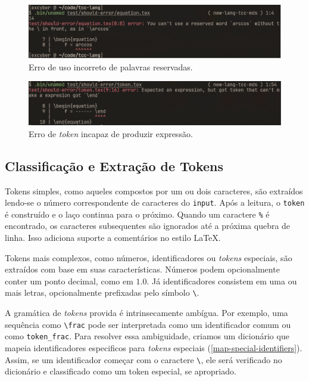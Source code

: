 \begin{figure}[H]
    \caption{\label{error-reserved-word} \small Erro de uso incorreto de palavras reservadas.}
    \begin{center}
        \includegraphics[scale=0.5]{./Imagens/error-reserved-word.png}
    \end{center}
\end{figure}


\begin{figure}[H]
    \caption{\label{error-cant-make-expression} \small Erro de \textit{token} incapaz de produzir expressão.}
    \begin{center}
        \includegraphics[scale=0.5]{./Imagens/error-cant-make-expression.png}
    \end{center}
\end{figure}


\subsection{Classificação e Extração de Tokens}


Tokens simples, como aqueles compostos por um ou dois caracteres, são extraídos lendo-se o número correspondente de caracteres do \texttt{input}. Após a leitura, o \texttt{token} é construído e o laço continua para o próximo. Quando um caractere \texttt{\%} é encontrado, os caracteres subsequentes são ignorados até a próxima quebra de linha. Isso adiciona suporte a comentários no estilo \LaTeX{}.

Tokens mais complexos, como números, identificadores ou \textit{tokens} especiais, são extraídos com base em suas características. Números podem opcionalmente conter um ponto decimal, como em $1.0$. Já identificadores consistem em uma ou mais letras, opcionalmente prefixadas pelo símbolo \verb|\|.

A gramática de \textit{tokens} provida é intrinsecamente ambígua. Por exemplo, uma sequência como \verb|\frac| pode ser interpretada como um identificador comum ou como \verb"token_frac". Para resolver essa ambiguidade, criamos um dicionário que mapeia identificadores especificos para \textit{tokens} especiais (\autoref{map-special-identifiers}). Assim, se um identificador começar com o caractere \verb|\|, ele será verificado no dicionário e classificado como um token especial, se apropriado.


